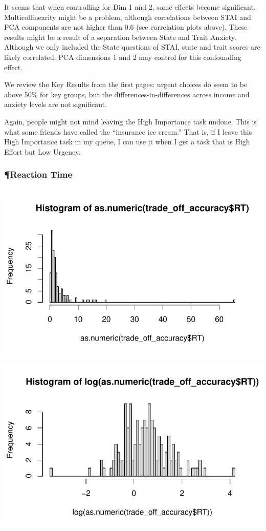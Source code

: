 It seems that when controlling for Dim 1 and 2, some effects become
significant. Multicollinearity might be a problem, although correlations
between STAI and PCA components are not higher than 0.6 (see correlation
plots above). These results might be a result of a separation between
State and Trait Anxiety. Although we only included the State questions
of STAI, state and trait scores are likely correlated. PCA dimensions 1
and 2 may control for this confounding effect.

We review the Key Results from the first pages: urgent choices do seem
to be above 50\% for key groups, but the differences-in-differences
across income and anxiety levels are not significant.

Again, people might not mind leaving the High Importance task undone.
This is what some friends have called the ``insurance ice cream.'' That
is, if I leave this High Importance task in my queue, I can use it when
I get a task that is High Effort but Low Urgency.\\

\hypertarget{reaction-time}{%
\subsubsection{¶Reaction Time}\label{reaction-time}}

\includegraphics{thesis-file-ppq_files/figure-latex/unnamed-chunk-16-1.pdf}

\includegraphics{thesis-file-ppq_files/figure-latex/unnamed-chunk-16-2.pdf}

